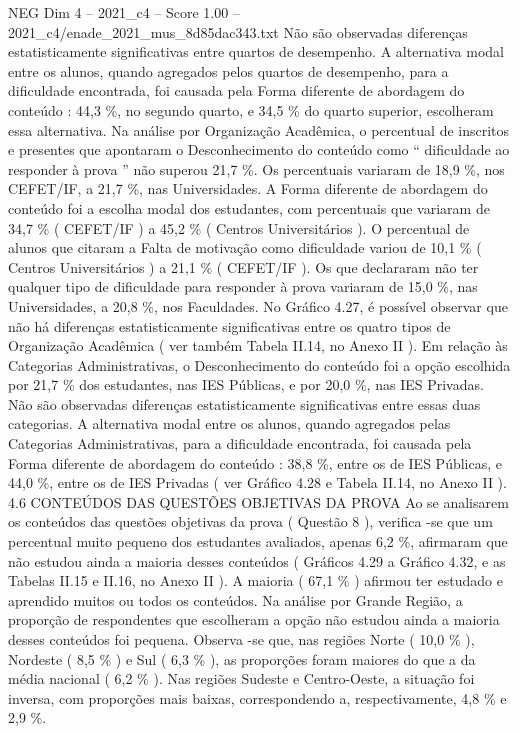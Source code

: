 \begin{textsample}{NEG Dim 4 – 2021\_c4 – Score 1.00 – 2021\_c4/enade\_2021\_mus\_8d85dac343.txt}
Não são observadas diferenças estatisticamente significativas entre quartos de desempenho.
A alternativa modal entre os alunos, quando agregados pelos quartos de desempenho, para a dificuldade encontrada, foi causada pela Forma diferente de abordagem do conteúdo : 44,3 \%, no segundo quarto, e 34,5 \% do quarto superior, escolheram essa alternativa.
Na análise por Organização Acadêmica, o percentual de inscritos e presentes que apontaram o Desconhecimento do conteúdo como “ dificuldade ao responder à prova ” não superou 21,7 \%.
Os percentuais variaram de 18,9 \%, nos CEFET/IF, a 21,7 \%, nas Universidades.
A Forma diferente de abordagem do conteúdo foi a escolha modal dos estudantes, com percentuais que variaram de 34,7 \% ( CEFET/IF ) a 45,2 \% ( Centros Universitários ).
O percentual de alunos que citaram a Falta de motivação como dificuldade variou de 10,1 \% ( Centros Universitários ) a 21,1 \% ( CEFET/IF ).
Os que declararam não ter qualquer tipo de dificuldade para responder à prova variaram de 15,0 \%, nas Universidades, a 20,8 \%, nos Faculdades.
No Gráfico 4.27, é possível observar que não há diferenças estatisticamente significativas entre os quatro tipos de Organização Acadêmica ( ver também Tabela II.14, no Anexo II ).
Em relação às Categorias Administrativas, o Desconhecimento do conteúdo foi a opção escolhida por 21,7 \% dos estudantes, nas IES Públicas, e por 20,0 \%, nas IES Privadas.
Não são observadas diferenças estatisticamente significativas entre essas duas categorias.
A alternativa modal entre os alunos, quando agregados pelas Categorias Administrativas, para a dificuldade encontrada, foi causada pela Forma diferente de abordagem do conteúdo : 38,8 \%, entre os de IES Públicas, e 44,0 \%, entre os de IES Privadas ( ver Gráfico 4.28 e Tabela II.14, no Anexo II ). 4.6 CONTEÚDOS DAS QUESTÕES OBJETIVAS DA PROVA Ao se analisarem os conteúdos das questões objetivas da prova ( Questão 8 ), verifica -se que um percentual muito pequeno dos estudantes avaliados, apenas 6,2 \%, afirmaram que não estudou ainda a maioria desses conteúdos ( Gráficos 4.29 a Gráfico 4.32, e as Tabelas II.15 e II.16, no Anexo II ).
A maioria ( 67,1 \% ) afirmou ter estudado e aprendido muitos ou todos os conteúdos.
Na análise por Grande Região, a proporção de respondentes que escolheram a opção não estudou ainda a maioria desses conteúdos foi pequena.
Observa -se que, nas regiões Norte ( 10,0 \% ), Nordeste ( 8,5 \% ) e Sul ( 6,3 \% ), as proporções foram maiores do que a da média nacional ( 6,2 \% ).
Nas regiões Sudeste e Centro-Oeste, a situação foi inversa, com proporções mais baixas, correspondendo a, respectivamente, 4,8 \% e 2,9 \%.

\end{textsample}

